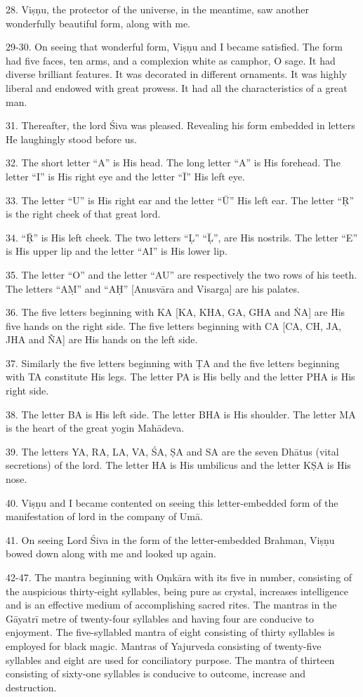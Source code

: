 28. Viṣṇu, the protector of the universe, in the meantime, saw another
wonderfully beautiful form, along with me.

29-30. On seeing that wonderful form, Viṣṇu and I became satisfied. The form had
five faces, ten arms, and a complexion white as camphor, O sage. It had diverse
brilliant features. It was decorated in different ornaments. It was highly
liberal and endowed with great prowess. It had all the characteristics of
a great man.

31. Thereafter, the lord Śiva was pleased. Revealing his form embedded in
letters He laughingly stood before us.

32. The short letter “A” is His head. The long letter “A” is His forehead.
The letter “I” is His right eye and the letter “Ī” His left eye.

33. The letter “U” is His right ear and the letter “Ū” His left ear. The letter
“Ṛ” is the right cheek of that great lord.

34. “Ṝ” is His left cheek. The two letters “Ḷ” “Ḹ”, are His nostrils. The letter
“E” is His upper lip and the letter “AI” is His lower lip.

35. The letter “O” and the letter “AU” are respectively the two rows of his
teeth. The letters “AṂ” and “AḤ” [Anusvāra and Visarga] are his palates.

36. The five letters beginning with KA [\ie KA, KHA, GA, GHA and ṄA] are His
five hands on the right side. The five letters beginning with CA [\ie CA, CH, JA,
JHA and ÑA] are His hands on the left side.

37. Similarly the five letters beginning with ṬA and the five letters beginning
with TA constitute His legs. The letter PA is His belly and the letter PHA is
His right side.

38. The letter BA is His left side. The letter BHA is His shoulder. The letter
MA is the heart of the great yogin Mahādeva.

39. The letters YA, RA, LA, VA, ŚA, ṢA and SA are the seven Dhātus (vital
secretions) of the lord. The letter HA is His umbilicus and the letter KṢA is
His nose.

40. Viṣṇu and I became contented on seeing this letter-embedded form of
the  manifestation of  lord in the company of Umā.

41. On seeing Lord Śiva in the form of the letter-embedded Brahman, Viṣṇu bowed
down along with me and looked up again.

42-47. The mantra beginning with Oṃkāra with its  five in number,
consisting of the auspicious thirty-eight syllables, being pure as crystal,
increases intelligence and is an effective medium of accomplishing sacred rites.
The mantras in the Gāyatrī metre of twenty-four syllables and having four
 are conducive to enjoyment. The five-syllabled mantra of eight
 consisting of thirty syllables is employed for black magic. Mantras
of Yajurveda consisting of twenty-five syllables and eight  are used
for conciliatory purpose. The mantra of thirteen  consisting of
sixty-one syllables is conducive to outcome, increase and destruction.

